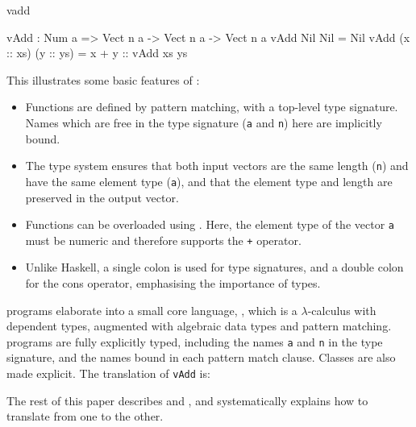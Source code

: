 \begin{SaveVerbatim}{vadd}

vAdd : Num a => Vect n a -> Vect n a -> Vect n a
vAdd Nil       Nil       = Nil
vAdd (x :: xs) (y :: ys) = x + y :: vAdd xs ys

\end{SaveVerbatim}

\noindent
This illustrates some basic features of \Idris{}:

\begin{itemize}
\item Functions are defined by pattern matching, with a top-level type signature.
Names which are free in the type signature (\texttt{a} and \texttt{n}) here
are implicitly bound.
\item The type system ensures that both input vectors are the same length (\texttt{n})
and have the same element type (\texttt{a}), and that the element type and length
are preserved in the output vector.
\item Functions can be overloaded using . Here, the element type
of the vector \texttt{a} must be numeric and therefore supports the \texttt{+} operator.
\item Unlike Haskell, a single colon is used for type signatures, and a double
colon for the cons operator, emphasising the importance of types.
\end{itemize}

\noindent
\Idris{} programs elaborate into a small core language, \TT{}, which is a $\lambda$-calculus
with dependent types, augmented with algebraic data types and pattern matching.
\TT{} programs are fully explicitly typed, including the names \texttt{a} and \texttt{n}
in the type signature, and the names bound in each pattern match clause.
Classes are also made explicit.
The \TT{} translation of \texttt{vAdd} is:


\noindent
The rest of this paper describes \Idris{} and \TT{}, and systematically explains
how to translate from one to the other.

